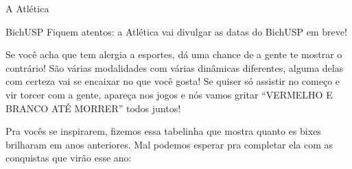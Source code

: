 \begin{secao}{A Atlética}
\begin{subsecao}{BichUSP}
Fiquem atentos: a Atlética vai divulgar as datas do BichUSP em breve!

Se você acha que tem alergia a esportes, dá uma chance de a gente te mostrar
o contrário! São várias modalidades com várias dinâmicas diferentes, alguma
delas com certeza vai se encaixar no que você gosta! Se quiser só assistir
no começo e vir torcer com a gente, apareça nos jogos e nós vamos gritar
``VERMELHO E BRANCO ATÉ MORRER'' todos juntos!



Pra vocês se inspirarem, fizemos essa tabelinha que mostra quanto es bixes
brilharam em anos anteriores. Mal podemos esperar pra completar ela com as
conquistas que virão esse ano:


\end{subsecao}
\end{secao}

